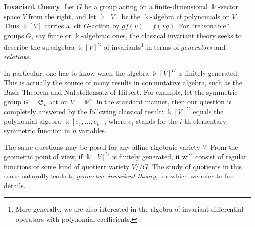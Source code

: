 \begin{asparaenum}[(A)]
	\item \textbf{Invariant theory}. Let $G$ be a group acting on a finite-dimensional $\Bbbk$-vector space $V$ from the right, and let $\Bbbk[V]$ be the $\Bbbk$-algebra of polynomials on $V$. Thus $\Bbbk[V]$ carries a left $G$-action by $gf(v) = f(vg)$. For ``reasonable'' groups $G$, say finite or $\Bbbk$-algebraic ones, the classical invariant theory seeks to describe the subalgebra $\Bbbk[V]^G$ of invariants\footnote{More generally, we are also interested in the algebra of invariant differential operators with polynomial coefficients.} in terms of \emph{generators} and \emph{relations}.

	In particular, one has to know when the algebra $\Bbbk[V]^G$ is finitely generated. This is actually the source of many results in commutative algebra, such as the Basis Theorem and Nullstellensatz of Hilbert. For example, let the symmetric group $G = \mathfrak{S}_n$ act on $V = \Bbbk^n$ in the standard manner, then our question is completely answered by the following classical result: $\Bbbk[V]^G$ equals the polynomial algebra $\Bbbk[e_1, \ldots, e_n]$, where $e_i$ stands for the $i$-th elementary symmetric function in $n$ variables.

	The same questions may be posed for any affine algebraic variety $V$. From the geometric point of view, if $\Bbbk[V]^G$ is finitely generated, it will consist of regular functions of some kind of quotient variety $V /\!/ G$. The study of quotients in this sense naturally leads to \emph{geometric invariant theory}, for which we refer to \cite{AG4} for details.
\end{asparaenum}
